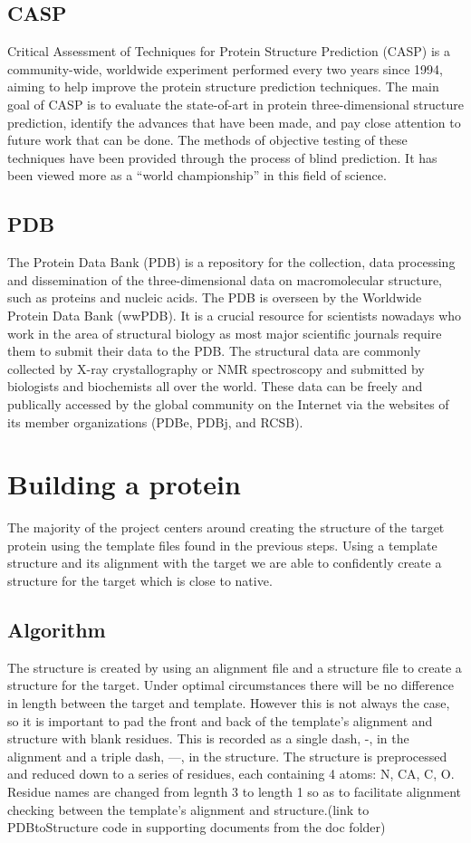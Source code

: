 \documentclass{article}
\begin{document}
\subsection{CASP}

Critical Assessment of Techniques for Protein Structure Prediction (CASP) is a community-wide, worldwide experiment performed every two years since 1994, aiming to help improve the protein structure prediction techniques. The main goal of CASP is to evaluate the state-of-art in protein three-dimensional structure prediction, identify the advances that have been made, and pay close attention to future work that can be done. The methods of objective testing of these techniques have been provided through the process of blind prediction. It has been viewed more as a “world championship” in this field of science. 
\subsection{PDB}

The Protein Data Bank (PDB) is a repository for the collection, data processing and dissemination of the three-dimensional data on macromolecular structure, such as proteins and nucleic acids. The PDB is overseen by the Worldwide Protein Data Bank (wwPDB). It is a crucial resource for scientists nowadays who work in the area of structural biology as most major scientific journals require them to submit their data to the PDB. The structural data are commonly collected by X-ray crystallography or NMR spectroscopy and submitted by biologists and biochemists all over the world. These data can be freely and publically accessed by the global community on the Internet via the websites of its member organizations (PDBe, PDBj, and RCSB). 

\section{Building a protein}

The majority of the project centers around creating the structure of the target protein using the template files found in the previous steps. Using a template structure and its alignment with the target we are able to confidently create a structure for the target which is close to native.
\subsection{Algorithm}

The structure is created by using an alignment file and a structure file to create a structure for the target. Under optimal circumstances there will be no difference in length between the target and template. However this is not always the case, so it is important to pad the front and back of the template's alignment and structure with blank residues. This is recorded as a single dash, -, in the alignment and a triple dash, ---, in the structure. The structure is preprocessed and reduced down to a series of residues, each containing 4 atoms: N, CA, C, O. Residue names are changed from legnth 3 to length 1 so as to facilitate alignment checking between the template's alignment and structure.(link to PDBtoStructure code in supporting documents from the doc folder)
\end{document}
